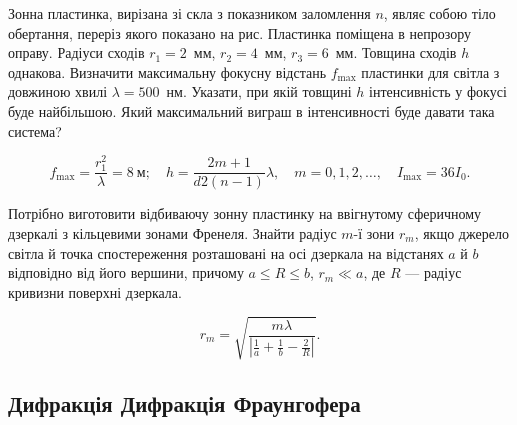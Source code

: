 \begin{problem}%
    Зонна пластинка, вирізана зі скла з показником заломлення $ n $, являє собою тіло обертання, переріз якого показано на рис. Пластинка поміщена в непрозору оправу. Радіуси сходів $r_1 = 2$~мм, $r_2 = 4$~мм,  $r_3 = 6$~мм. Товщина сходів $h$ однакова. Визначити максимальну фокусну відстань $f_{\max}$ пластинки для світла з довжиною хвилі $\lambda = 500$~нм. Указати, при якій товщині $h$ інтенсивність у фокусі буде найбільшою. Який максимальний виграш в інтенсивності буде давати така система?

    \begin{center}
        
    \end{center}

    \begin{solution}
        \begin{equation*}
            f_{\max} = \frac{r_1^2}{\lambda} = 8\ \text{м}; \quad h = \frac{2m+1}{d2(n - 1)}\lambda, \quad m = 0, 1, 2, \ldots, \quad I_{\max} = 36 I_0.
        \end{equation*}
    \end{solution}
\end{problem}


\begin{problem}%
    Потрібно виготовити відбиваючу зонну пластинку на ввігнутому
    сферичному дзеркалі з кільцевими зонами Френеля. Знайти радіус $ m $-ї
    зони $ r_m $, якщо джерело світла й точка спостереження розташовані на осі
    дзеркала на відстанях $ a $ й $ b $ відповідно від його вершини, причому $ a \le R \le b $, $ r_m \ll a $, де $ R $ --- радіус кривизни поверхні дзеркала.
    \begin{solution}
        \begin{equation*}
            r_m = \sqrt{\frac{m\lambda}{\left|\frac1a + \frac1b - \frac2R \right|}}.
        \end{equation*}
    \end{solution}
\end{problem}





\subsection*{Дифракція Дифракція Фраунгофера}


